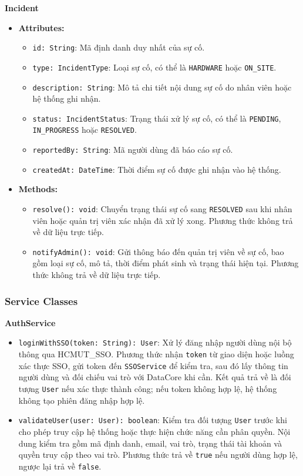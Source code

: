 \noindent\textbf{Incident}
\begin{itemize}
	\item \textbf{Attributes:}
	\begin{itemize}
		\item \texttt{id: String}: Mã định danh duy nhất của sự cố.
		\item \texttt{type: IncidentType}: Loại sự cố, có thể là \texttt{HARDWARE} hoặc \texttt{ON\_SITE}.
		\item \texttt{description: String}: Mô tả chi tiết nội dung sự cố do nhân viên hoặc hệ thống ghi nhận.
		\item \texttt{status: IncidentStatus}: Trạng thái xử lý sự cố, có thể là \texttt{PENDING}, \texttt{IN\_PROGRESS} hoặc \texttt{RESOLVED}.
		\item \texttt{reportedBy: String}: Mã người dùng đã báo cáo sự cố.
		\item \texttt{createdAt: DateTime}: Thời điểm sự cố được ghi nhận vào hệ thống.
	\end{itemize}
	\item \textbf{Methods:}
	\begin{itemize}
		\item \texttt{resolve(): void}: Chuyển trạng thái sự cố sang \texttt{RESOLVED} sau khi nhân viên hoặc quản trị viên xác nhận đã xử lý xong. Phương thức không trả về dữ liệu trực tiếp.
		\item \texttt{notifyAdmin(): void}: Gửi thông báo đến quản trị viên về sự cố, bao gồm loại sự cố, mô tả, thời điểm phát sinh và trạng thái hiện tại. Phương thức không trả về dữ liệu trực tiếp.
	\end{itemize}
\end{itemize}

\subsubsection{Service Classes}

\noindent\textbf{AuthService}
\begin{itemize}
    \item \texttt{loginWithSSO(token: String): User}: Xử lý đăng nhập người dùng nội bộ thông qua \mbox{HCMUT\_SSO}. Phương thức nhận \texttt{token} từ giao diện hoặc luồng xác thực SSO, gửi token đến \texttt{SSOService} để kiểm tra, sau đó lấy thông tin người dùng và đối chiếu vai trò với DataCore khi cần. Kết quả trả về là đối tượng \texttt{User} nếu xác thực thành công; nếu token không hợp lệ, hệ thống không tạo phiên đăng nhập hợp lệ.
    \item \texttt{validateUser(user: User): boolean}: Kiểm tra đối tượng \texttt{User} trước khi cho phép truy cập hệ thống hoặc thực hiện chức năng cần phân quyền. Nội dung kiểm tra gồm mã định danh, email, vai trò, trạng thái tài khoản và quyền truy cập theo vai trò. Phương thức trả về \texttt{true} nếu người dùng hợp lệ, ngược lại trả về \texttt{false}.
\end{itemize}

